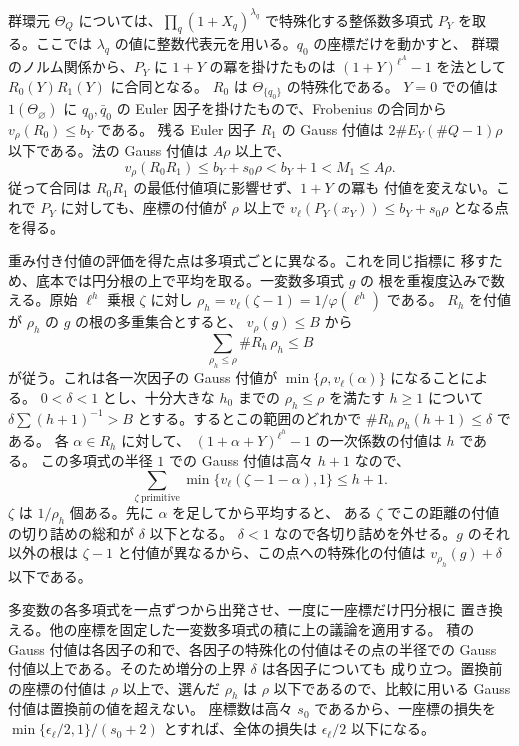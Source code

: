 群環元 \(\Theta_Q\) については、\(\prod_q(1+X_q)^{\lambda_q}\)
で特殊化する整係数多項式 \(P_Y\) を取る。ここでは
\(\lambda_q\) の値に整数代表元を用いる。\(q_0\) の座標だけを動かすと、
群環のノルム関係から、\(P_Y\) に \(1+Y\) の冪を掛けたものは
\((1+Y)^{\ell^A}-1\) を法として \(R_0(Y)R_1(Y)\) に合同となる。
\(R_0\) は \(\Theta_{\{q_0\}}\) の特殊化である。
\(Y=0\) での値は \(1(\Theta_\varnothing)\) に \(q_0,\bar q_0\) の Euler
因子を掛けたもので、Frobenius の合同から \(v_\rho(R_0)\le b_Y\) である。
残る Euler 因子 \(R_1\) の Gauss 付値は
\(2\#E_Y(\#Q-1)\rho\) 以下である。法の Gauss 付値は \(A\rho\) 以上で、
\[
 v_\rho(R_0R_1)\le b_Y+s_0\rho<b_Y+1<M_1\le A\rho .
\]
従って合同は \(R_0R_1\) の最低付値項に影響せず、\(1+Y\) の冪も
付値を変えない。これで \(P_Y\) に対しても、座標の付値が \(\rho\) 以上で
\(v_\ell(P_Y(x_Y))\le b_Y+s_0\rho\) となる点を得る。

重み付き付値の評価を得た点は多項式ごとに異なる。これを同じ指標に
移すため、底本では円分根の上で平均を取る。一変数多項式 \(g\) の
根を重複度込みで数える。原始 \(\ell^h\) 乗根 \(\zeta\) に対し
\(\rho_h=v_\ell(\zeta-1)=1/\varphi(\ell^h)\) である。
\(R_h\) を付値が \(\rho_h\) の \(g\) の根の多重集合とすると、
\(v_\rho(g)\le B\) から
\[
 \sum_{\rho_h\le\rho}\#R_h\,\rho_h\le B
\]
が従う。これは各一次因子の Gauss 付値が
\(\min\{\rho,v_\ell(\alpha)\}\) になることによる。
\(0<\delta<1\) とし、十分大きな \(h_0\) までの
\(\rho_h\le\rho\) を満たす \(h\ge1\) について
\(\delta\sum (h+1)^{-1}>B\) とする。するとこの範囲のどれかで
\(\#R_h\,\rho_h(h+1)\le\delta\) である。
各 \(\alpha\in R_h\) に対して、
\((1+\alpha+Y)^{\ell^h}-1\) の一次係数の付値は \(h\) である。
この多項式の半径 \(1\) での Gauss 付値は高々 \(h+1\) なので、
\[
 \sum_{\zeta\ \mathrm{primitive}}
          \min\{v_\ell(\zeta-1-\alpha),1\}\le h+1 .
\]
\(\zeta\) は \(1/\rho_h\) 個ある。先に \(\alpha\) を足してから平均すると、
ある \(\zeta\) でこの距離の付値の切り詰めの総和が \(\delta\) 以下となる。
\(\delta<1\) なので各切り詰めを外せる。\(g\) のそれ以外の根は
\(\zeta-1\) と付値が異なるから、この点への特殊化の付値は
\(v_{\rho_h}(g)+\delta\) 以下である。

多変数の各多項式を一点ずつから出発させ、一度に一座標だけ円分根に
置き換える。他の座標を固定した一変数多項式の積に上の議論を適用する。
積の Gauss 付値は各因子の和で、各因子の特殊化の付値はその点の半径での
Gauss 付値以上である。そのため増分の上界 \(\delta\) は各因子についても
成り立つ。置換前の座標の付値は \(\rho\) 以上で、選んだ \(\rho_h\) は
\(\rho\) 以下であるので、比較に用いる Gauss 付値は置換前の値を超えない。
座標数は高々 \(s_0\) であるから、一座標の損失を
\(\min\{\epsilon_\ell/2,1\}/(s_0+2)\) とすれば、全体の損失は
\(\epsilon_\ell/2\) 以下になる。

